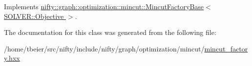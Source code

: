 Implements \hyperlink{classnifty_1_1graph_1_1optimization_1_1mincut_1_1MincutFactoryBase_a10a6f7a7fffcd65b351e94387a918847}{nifty\+::graph\+::optimization\+::mincut\+::\+Mincut\+Factory\+Base$<$ S\+O\+L\+V\+E\+R\+::\+Objective $>$}.



The documentation for this class was generated from the following file\+:\begin{DoxyCompactItemize}
\item 
/home/tbeier/src/nifty/include/nifty/graph/optimization/mincut/\hyperlink{mincut__factory_8hxx}{mincut\+\_\+factory.\+hxx}\end{DoxyCompactItemize}
